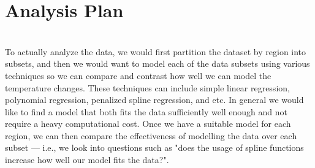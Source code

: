 \documentclass[aoas]{imsart}\usepackage[]{graphicx}\usepackage[]{xcolor}
\begin{document}
\section{Analysis Plan}\hfill\\

To actually analyze the data, we would first partition the dataset by region into subsets, and then we would want to model each of the data subsets using various techniques so we can compare and contrast how well we can model the temperature changes. These techniques can include simple linear regression, polynomial regression, penalized spline regression, and etc. In general we would like to find a model that both fits the data sufficiently well enough and not require a heavy computational cost. Once we have a suitable model for each region, we can then compare the effectiveness of modelling the data over each subset --- i.e., we look into questions such as "does the usage of spline functions increase how well our model fits the data?".

%
%

%
\end{document}
